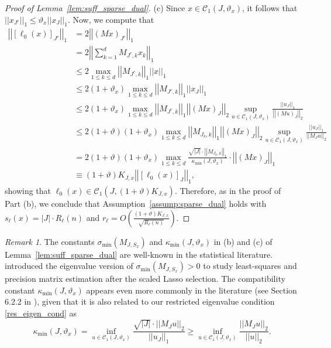 \documentclass[ejsv2,noshowframe]{imsart}
\theoremstyle{plain}
\theoremstyle{definition}
\theoremstyle{remark}
\newtheorem{remark}{Remark}
\newcommand{\norm}[1]{\left|\left| #1 \right|\right|}
\begin{document}
\begin{proof}[Proof of Lemma~\ref{lem:suff_sparse_dual}]
	\noindent (c) Since $x\in \mathcal{C}_1(J,\vartheta_x)$, it follows that $\norm{x_{J^c}}_1 \leq \vartheta_x \norm{x_J}_1$. Now, we compute that
	\begin{align*}
		\norm{\left[\ell_0(x)\right]_{J^c}}_1 &=2\norm{\left(M x\right)_{J^c}}_1 \\
		&= 2\norm{\sum_{k=1}^d M_{J^c,k} x_k}_1\\
		&\leq 2\max_{1\leq k \leq d} \norm{M_{J^c,k}}_1 \norm{x}_1\\
		&\leq 2(1+\vartheta_x) \max_{1\leq k \leq d} \norm{M_{J^c,k}}_1 \norm{x_J}_1\\
		&\leq 2(1+\vartheta_x) \max_{1\leq k \leq d} \norm{M_{J^c,k}}_1 \norm{(Mx)_J}_2 \sup_{u\in \mathcal{C}_1(J,\vartheta_x)} \frac{\norm{u_J}_1}{\norm{(Mu)_J}_2}\\
		&\leq 2(1+\vartheta) (1+\vartheta_x) \max_{1\leq k \leq d} \norm{M_{J_k,k}}_1 \norm{(Mx)_J}_2 \sup_{u\in \mathcal{C}_1(J,\vartheta_x)} \frac{\norm{u_J}_1}{\norm{M_J u}_2}\\
		&= 2(1+\vartheta) (1+\vartheta_x) \max_{1\leq k \leq d} \frac{\sqrt{|J|}\cdot \norm{M_{J_k,k}}_1}{\kappa_{\min}(J,\vartheta_x)} \cdot \norm{\left(Mx\right)_J}_1\\
		&\equiv (1+\vartheta)K_{J,x} \norm{\left[\ell_0(x)\right]_J}_1,
	\end{align*}
	showing that $\ell_0(x) \in \mathcal{C}_1\left(J,(1+\vartheta)K_{J,x}\right)$. Therefore, as in the proof of Part (b), we conclude that Assumption~\ref{assump:sparse_dual} holds with $s_{\ell}(x)=|J|\cdot R_{\ell}(n)$ and $r_{\ell} =O\left(\frac{(1+\vartheta) K_{J,x}}{\sqrt{R_{\ell}(n)}}\right)$.
\end{proof}

\begin{remark}
	The constants $\sigma_{\min}(M_{J,S_x})$ and $\kappa_{\min}(J,\vartheta_x)$ in (b) and (c) of Lemma~\ref{lem:suff_sparse_dual} are well-known in the statistical literature. \cite{sun2012scaled,sun2013sparse} introduced the eigenvalue version of $\sigma_{\min}(M_{J,S_x}) >0$ to study least-squares and precision matrix estimation after the scaled Lasso selection. The compatibility constant $\kappa_{\min}(J,\vartheta_x)$ appears even more commonly in the literature (see Section 6.2.2 in \citealt{buhlmann2011statistics}), given that it is also related to our restricted eigenvalue condition \eqref{res_eigen_cond} as
	$$ \kappa_{\min}(J,\vartheta_x)=\inf\limits_{u\in \mathcal{C}_1(J,\vartheta_x)} \frac{\sqrt{|J|} \cdot \norm{M_Ju}_2}{\norm{u_J}_1} \geq \inf\limits_{u\in \mathcal{C}_1(J,\vartheta_x)} \frac{\norm{M_Ju}_2}{\norm{u}_2}.$$
\end{remark}
\end{document}
